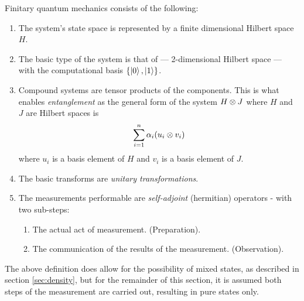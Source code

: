 Finitary quantum mechanics consists of the following:
\begin{enumerate}
  \item The system's state space is represented by a finite dimensional Hilbert space $H$.
    \label{lis:qfm1}
  \item The basic type of the system is that of \qubit --- 2-dimensional Hilbert space --- with the
    computational basis $\{\left\vert{0}\right\rangle, \left\vert{1}\right\rangle\}$.\label{lis:qfm2}
  \item Compound systems are tensor products of the components. This is what enables
    \emph{entanglement} as the general form of the system $H\otimes J$ where $H$ and $J$ are Hilbert
    spaces is
    \[
      \sum_{i=1}^{n}\alpha_{i} (u_{i} \otimes v_{i})
    \]
    where $u_{i}$ is a basis element of $H$ and $v_{i}$ is a basis element of $J$.\label{lis:qfm3}
  \item The basic transforms are \emph{unitary transformations}. \label{lis:qfm4}
  \item The measurements performable are \emph{self-adjoint} (hermitian) operators - with two
    sub-steps:\label{lis:qfm5}
    \begin{enumerate}
      \item The actual act of measurement. (Preparation).\label{lis:qfm5a}
      \item The communication of the results of the measurement. (Observation).\label{lis:qfm5b}
    \end{enumerate}
\end{enumerate}
The above definition does allow for the possibility of mixed states, as described in section
\ref{sec:density}, but for the remainder of this section, it is assumed both steps of the
measurement are carried out, resulting in pure states only.

